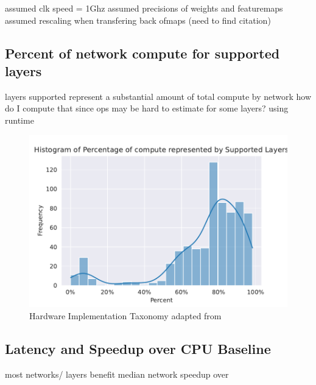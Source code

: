 
assumed clk speed = 1Ghz
assumed precisions of weights and featuremaps
assumed rescaling when transfering back ofmaps (need to find citation)

\subsection{Percent of network compute for supported layers}
\label{chap:hero:sim_platform:cigar_side}

layers supported represent a substantial amount of total compute by network
how do I compute that since ops may be hard to estimate for some layers?
using runtime

\begin{figure}[ht]
    \centering
    \includegraphics[scale=0.58]{Plots/overview/percent.pdf}
    \caption{Hardware Implementation Taxonomy adapted from \cite{maestro}}
    \label{fig:hw_taxonomy}
\end{figure}

\subsection{Latency and Speedup over CPU Baseline}
\label{chap:hero:sim_platform:cigar_side}

most networks/ layers benefit
median network speedup over 

